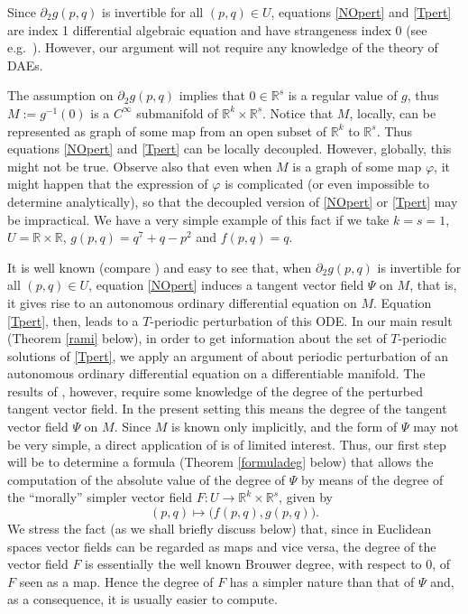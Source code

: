 \documentclass[a4paper]{amsart}
\numberwithin{equation}{section}
\newcommand{\R}{\mathbb{R}}
\begin{document}
Since $\partial_2g(p,q)$ is invertible for all $(p,q)\in U$, equations 
\eqref{NOpert} and \eqref{Tpert} are index 1 differential algebraic equation and have 
strangeness index $0$ (see e.g.\ \cite{KM}). However, our argument will not require any 
knowledge of the theory of DAEs.  

The assumption on $\partial_2g(p,q)$ implies that $0\in\R^s$ is a regular value of $g$, 
thus $M:=g^{-1}(0)$ is a $C^\infty$ submanifold of $\R^k\times\R^s$. Notice that $M$,
locally, can be represented as graph of some map from an open subset of $\R^k$ to $\R^s$. 
Thus equations
\eqref{NOpert} and \eqref{Tpert} can be locally decoupled. However, globally, this might 
not be true. Observe also that even when $M$ is a graph of some map $\varphi$, it might
happen that the expression of $\varphi$ is complicated (or even impossible to determine
analytically), so that the decoupled version of \eqref{NOpert} or \eqref{Tpert} may be
impractical. We have a very simple example of this fact if we take $k=s=1$, $U=\R\times\R$,
$g(p,q)=q^7+q-p^2$ and $f(p,q)=q$. 

It is well known (compare \cite[\S 4.5]{KM}) and easy to see that, when $\partial_2g(p,q)$ 
is invertible for all $(p,q)\in U$, equation \eqref{NOpert} induces a tangent vector field 
$\Psi$ on $M$, that is, it gives rise to an autonomous ordinary differential equation on 
$M$. Equation \eqref{Tpert}, then, leads to a $T$-periodic perturbation of this ODE.
In our main result (Theorem \ref{rami} below), in order to get information about the set of 
$T$-periodic solutions of \eqref{Tpert}, we apply an argument of  \cite{FS98} about periodic 
perturbation of an autonomous ordinary differential equation on a differentiable manifold. 
The results of \cite{FS98}, however, require some knowledge of the degree of the perturbed 
tangent vector field. In the present setting this means the degree of the tangent vector field 
$\Psi$ on $M$.  Since $M$ is known only implicitly, and the form of $\Psi$ may not be very 
simple, a direct application of \cite{FS98} is of limited interest. Thus, our first step will 
be to determine a formula (Theorem \ref{formuladeg} below) that allows the computation of the 
absolute value of the degree of $\Psi$ by means of the degree of the ``morally'' simpler 
vector field $F:U\to\R^k\times\R^s$, given by
\begin{equation}\label{defF}
(p,q)\mapsto \big(f(p,q),g(p,q)\big).
\end{equation}
We stress the fact (as we shall briefly discuss below) that, since in Euclidean spaces 
vector fields can be regarded as maps and vice versa,  the degree of the vector field $F$ is 
essentially the well known Brouwer degree, with respect to $0$, of $F$ seen as a map. Hence 
the degree of $F$ has a simpler nature than that of $\Psi$ and, as a consequence, it is usually 
easier to compute. 
\end{document}
